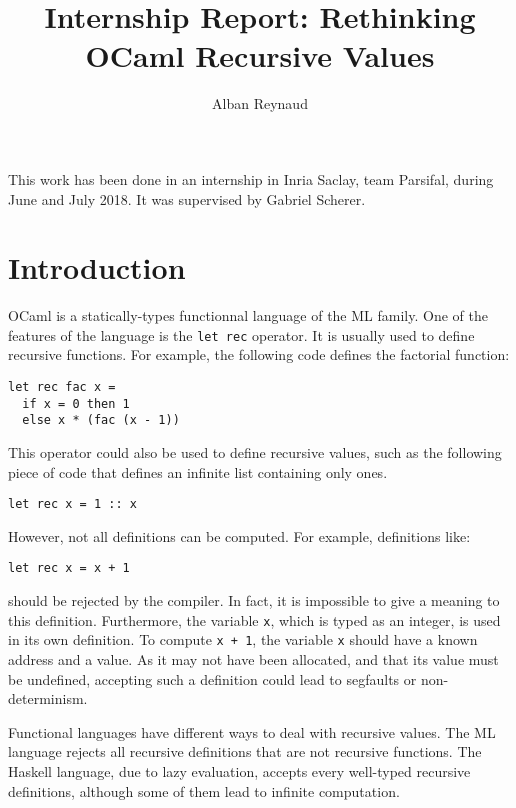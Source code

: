\documentclass{article}
\title{Internship Report: Rethinking OCaml Recursive Values}
\author{Alban Reynaud}
\date{}
\begin{document}
\maketitle

This work has been done in an internship in Inria Saclay, team Parsifal, during
June and July 2018. It was supervised by Gabriel Scherer.

\section{Introduction}
OCaml is a statically-types functionnal language of the ML family. One of the
features of the language is the \lstinline|let rec| operator. It is usually
used to define recursive functions. For example, the following code defines the
factorial function:

\begin{lstlisting}
let rec fac x =
  if x = 0 then 1
  else x * (fac (x - 1))
\end{lstlisting}

This operator could also be used to define recursive values, such as the
following piece of code that defines an infinite list containing only ones.
\begin{lstlisting}
let rec x = 1 :: x
\end{lstlisting}

However, not all definitions can be computed. For example, definitions like:
\begin{lstlisting}
let rec x = x + 1
\end{lstlisting}
should be rejected by the compiler. In fact, it is impossible to give a meaning
to this definition. Furthermore, the variable \lstinline|x|, which is typed as
an integer, is used in its own definition. To compute \lstinline|x + 1|, the
variable \lstinline|x| should have a known address and a value. As it may not
have been allocated, and that its value must be undefined, accepting such a
definition could lead to segfaults or non-determinism.

Functional languages have different ways to deal with recursive values. The
ML language rejects all recursive definitions that are not recursive functions.
The Haskell language, due to lazy evaluation, accepts every well-typed recursive
definitions, although some of them lead to infinite computation.
\end{document}
